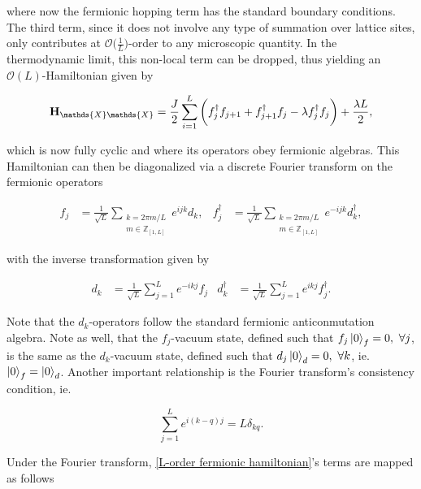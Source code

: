 \documentclass{homework}
\begin{document}
where now the fermionic hopping term has the standard boundary conditions. The third term, since it does not involve any type of summation over lattice sites, only contributes at $\mathcal{O}\bigg(\frac{1}{L}\bigg)$-order to any microscopic quantity. In the thermodynamic limit, this non-local term can be dropped, thus yielding an $\mathcal{O}(L)$-Hamiltonian given by 

\begin{equation}
    {\bf H}_{\mathds{X}\mathds{X}}  = \frac{J}{2} \sum_{i=1}^{L} \bigg(f_{j}^{\dagger} f_{j+1} + f_{j+1}^{\dagger} f_j - \lambda f_{j}^{\dagger} f_{j}\bigg) + \frac{\lambda L}{2},
    \label{L-order fermionic hamiltonian}
\end{equation}

which is now fully cyclic and where its operators obey fermionic algebras. This Hamiltonian can then be diagonalized via a discrete Fourier transform on the fermionic operators 

\begin{align}
    f_j &= \frac{1}{\sqrt{L}} \sum_{\substack{k = {2\pi m/L}\\
    m \in \mathds{Z}_{[1, L]} }}
                  e^{ijk} d_k, & f_j^{\dagger} &=\frac{1}{\sqrt{L}}  \sum_{\substack{k = {2\pi m/L}\\
    m \in \mathds{Z}_{[1, L]}}} e^{-ijk} d_k^{\dagger},
\end{align}

with the inverse transformation given by 

\begin{align}
    d_k &= \frac{1}{\sqrt{L}} \sum_{j=1}^{L}
                  e^{-ikj} f_j &  d_k^{\dagger} &= \frac{1}{\sqrt{L}} \sum_{j=1}^{L}
                  e^{ikj} f_j^{\dagger}.
\end{align}

Note that the $d_k$-operators follow the standard fermionic anticonmutation algebra. Note as well, that the $f_j$-vacuum state, defined such that $f_j \ket{0}_f = 0, \textnormal{ } \forall j$, is the same as the $d_k$-vacuum state, defined such that $d_j \ket{0}_d = 0, \textnormal{ } \forall k$, ie. $\ket{0}_f = \ket{0}_d$. Another important relationship is the Fourier transform's consistency condition, ie. 

$$
\sum_{j=1}^{L} e^{i(k-q)j} = L \delta_{kq}.
$$

Under the Fourier transform, \eqref{L-order fermionic hamiltonian}'s terms are mapped as follows 
\end{document}
